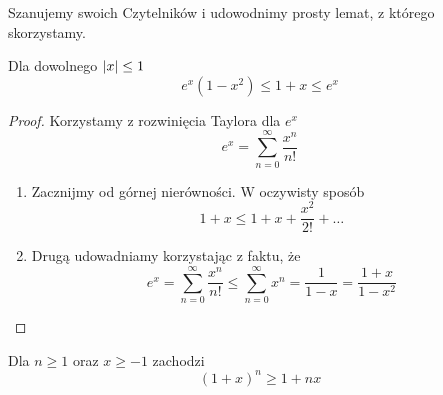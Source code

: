Szanujemy swoich Czytelników i udowodnimy prosty lemat, z którego skorzystamy.
\begin{lemma}
	Dla dowolnego \( \left\lvert x\right\rvert \leq 1 \)
	\[
		e^x(1 - x^2) \leq 1 + x \leq e^x
	\]
\end{lemma}
\begin{proof}
	Korzystamy z rozwinięcia Taylora dla \( e^x \)
	\[
		e^x = \sum_{n=0}^\infty \frac{x^n}{n!}
	\]
	\begin{enumerate}
		\item Zacznijmy od górnej nierówności. W oczywisty sposób
		      \[
			      1 + x \leq 1 + x + \frac{x^2}{2!} + \dots
		      \]
		\item Drugą udowadniamy korzystając z faktu, że
		      \[
			      e^x = \sum_{n=0}^\infty \frac{x^n}{n!} \leq \sum_{n=0}^\infty x^n = \frac{1}{1-x} = \frac{1 + x}{1 - x^2}
		      \]
	\end{enumerate}
\end{proof}
\begin{lemma}
	Dla \( n \geq 1 \) oraz \(x \geq -1\) zachodzi
	\[
		(1 + x)^n \geq 1 + nx
	\]
\end{lemma}

